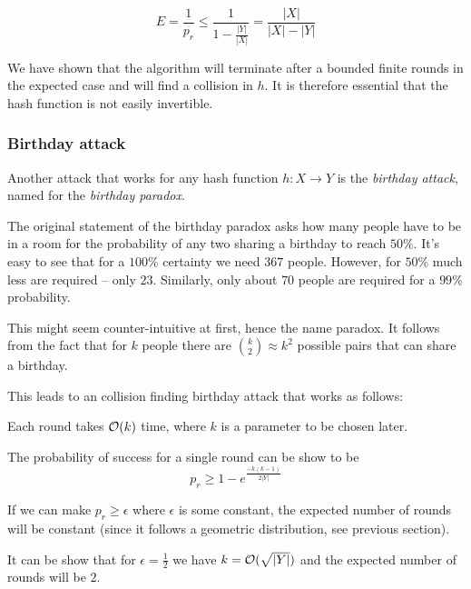 \[
E = \frac{1}{p_r} \le \frac{1}{1-\frac{|Y|}{|X|}} = \frac{|X|}{|X|-|Y|}
\]

We have shown that the algorithm will terminate after a bounded finite rounds in the expected case and will find a collision in $h$.
It is therefore essential that the hash function is not easily invertible.

\subsubsection{Birthday attack}
Another attack that works for any hash function $h: X \to Y$ is the \emph{birthday attack}, named for the \emph{birthday paradox}.

The original statement of the birthday paradox asks how many people have to be in a room for the probability of any two sharing a birthday to reach $50\%$. 
It's easy to see that for a $100\%$ certainty we need $367$ people. However, for $50\%$ much less are required -- only $23$. Similarly, only about $70$ people are required for a $99\%$ probability.

This might seem counter-intuitive at first, hence the name paradox.
It follows from the fact that for $k$ people there are ${k \choose 2} \approx k^2$ possible pairs that can share a birthday.

This leads to an collision finding birthday attack that works as follows:

\begin{algorithm}
\begin{algorithmic}[1]
		 
			\State {}
		\EndIf
	\EndWhile
\end{algorithmic}
\end{algorithm}

Each round takes $\mathcal{O}(k)$ time, where $k$ is a parameter to be chosen later.

The probability of success for a single round can be show to be
\[
p_r \ge 1 - e^\frac{-k(k-1)}{2|Y|}
\]

If we can make $p_r \ge \epsilon$ where $\epsilon$ is some constant, the expected number of rounds will be constant (since it follows a geometric distribution, see previous section).

It can be show that for $\epsilon = \frac{1}{2}$ we have $k = \mathcal{O}(\sqrt{|Y|})$ and the expected number of rounds will be $2$.

